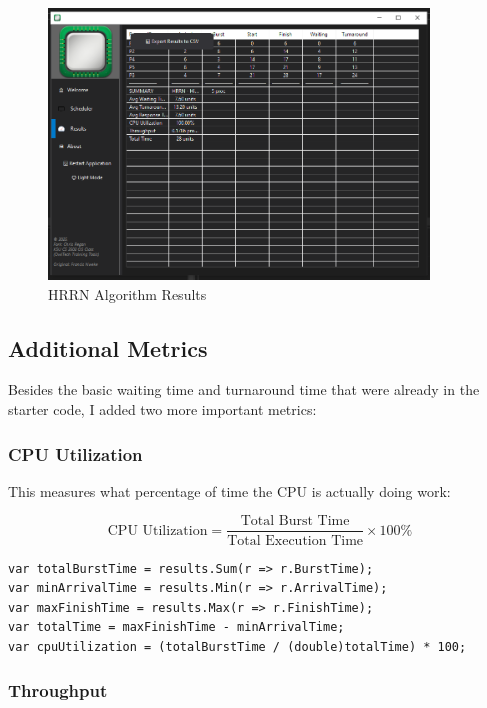 \documentclass[12pt,letterpaper]{article}
\begin{document}
\begin{figure}[H]
    \centering
    \includegraphics[width=0.9\textwidth]{hrrn_results.png}
    \caption{HRRN Algorithm Results}
    \label{fig:hrrn}
\end{figure}

\newpage

\subsection{Additional Metrics}

Besides the basic waiting time and turnaround time that were already in the 
starter code, I added two more important metrics:

\subsubsection{CPU Utilization}

This measures what percentage of time the CPU is actually doing work:

\[
\text{CPU Utilization} = \frac{\text{Total Burst Time}}{\text{Total Execution Time}} \times 100\%
\]

\begin{lstlisting}[caption={CPU Utilization Calculation}]
var totalBurstTime = results.Sum(r => r.BurstTime);
var minArrivalTime = results.Min(r => r.ArrivalTime);
var maxFinishTime = results.Max(r => r.FinishTime);
var totalTime = maxFinishTime - minArrivalTime;
var cpuUtilization = (totalBurstTime / (double)totalTime) * 100;
\end{lstlisting}

\subsubsection{Throughput}
\end{document}
